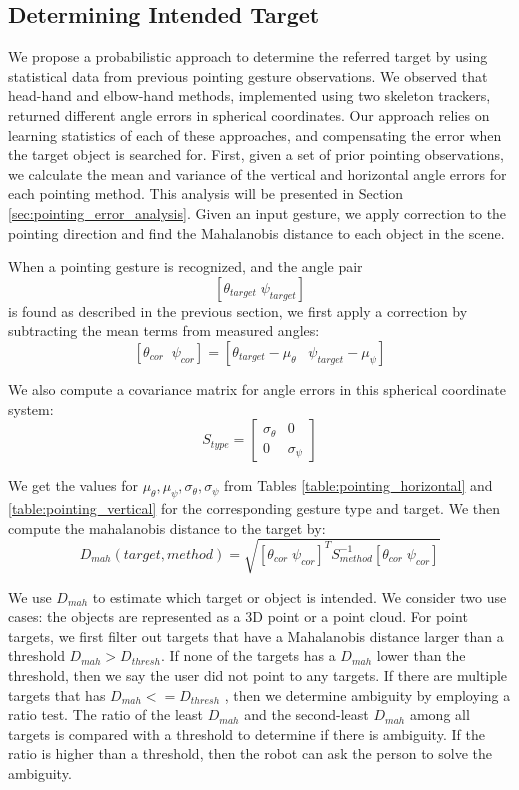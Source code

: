 \subsection{Determining Intended Target}
\label{sec:pointing_determining_intended_target}

We propose a probabilistic approach to determine the referred target by using statistical data from previous pointing gesture observations. We observed that head-hand and elbow-hand methods, implemented using two skeleton trackers, returned different angle errors in spherical coordinates. Our approach relies on learning statistics of each of these approaches, and compensating the error when the target object is searched for. First, given a set of prior pointing observations, we calculate the mean and variance of the vertical and horizontal angle errors for each pointing method. This analysis will be presented in Section \ref{sec:pointing_error_analysis}. Given an input gesture, we apply correction to the pointing direction and find the Mahalanobis distance to each object in the scene.

When a pointing gesture is recognized, and the angle pair $$[\theta_{target}\;\psi_{target}]$$ is found as described in the previous section, we first apply a correction by subtracting the mean terms from measured angles:
$$[\theta_{cor}\;\;\psi_{cor}]=[\theta_{target}-\mu_{\theta}\;\;\;\psi_{target}-\mu_{\psi}]$$
 
We also compute a covariance matrix for angle errors in this spherical coordinate system: 
$$S_{type} = \begin{bmatrix}
\sigma_{\theta}&0\\ 0&\sigma_{\psi}
\end{bmatrix} $$

We get the values for $\mu_{\theta}, \mu_{\psi}, \sigma_{\theta} ,\sigma_{\psi}$ from Tables \ref{table:pointing_horizontal} and \ref{table:pointing_vertical} for the corresponding gesture type and target. We then compute the mahalanobis distance to the target by:
$$D_{mah}(target,method)=\sqrt{ [\theta_{cor}\;\psi_{cor}]^T S_{method}^{-1} [\theta_{cor}\;\psi_{cor}]}$$
 
We use $D_{mah}$ to estimate which target or object is intended. We consider two use cases: the objects are represented as a 3D point or a point cloud. For point targets, we first filter out targets that have a Mahalanobis distance larger than a threshold $D_{mah} > D_{thresh}$. If none of the targets has a $D_{mah}$ lower than the threshold, then we say the user did not point to any targets. If there are multiple targets that has $D_{mah} <= D_{thresh}$ , then we determine ambiguity by employing a ratio test. The ratio of the least $D_{mah}$ and the second-least $D_{mah}$ among all targets is compared with a threshold to determine if there is ambiguity. If the ratio is higher than a threshold, then the robot can ask the person to solve the ambiguity.

